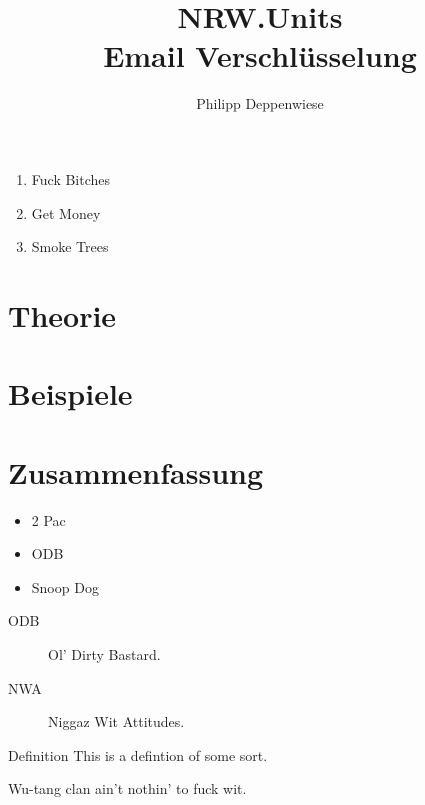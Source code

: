 \documentclass[xetex,mathserif,serif]{beamer}
\title{\textbf{NRW.Units}\\ Email Verschlüsselung}
\author{Philipp Deppenwiese}
\begin{document}
	\frame{\titlepage}
	\begin{frame}
		\begin{enumerate}
			\item Fuck Bitches
			\item Get Money
			\item Smoke Trees
		\end{enumerate}
	\end{frame}
	\section{Theorie}
	\section{Beispiele}
	\section{Zusammenfassung}

	\begin{frame}
		\blindtext
	\end{frame}

	\begin{frame}
		\begin{itemize}
			\item 2 Pac
			\item ODB
			\item Snoop Dog
		\end{itemize}
	\end{frame}

	\begin{frame}
		\begin{description}
			\item[ODB] Ol' Dirty Bastard.
			\item[NWA] Niggaz Wit Attitudes.
		\end{description}
		\end{frame}

	\begin{frame}
		\begin{block}{Definition}
			This is a defintion of some sort.
		\end{block}
	\end{frame}

	\begin{frame}
		\begin{theorem}[RZA, 1993]
			Wu-tang clan ain't nothin' to fuck wit.
		\end{theorem}
	\end{frame}
\end{document}
